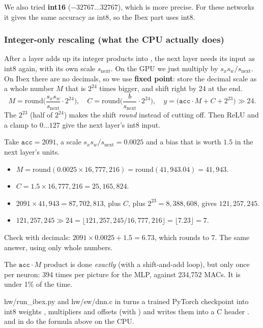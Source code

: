 We also tried \textbf{int16} ($-32767\dots32767$), which is more precise. For these networks it gives
the same accuracy as int8, so the Ibex part uses int8.

\subsubsection*{Integer-only rescaling (what the CPU actually does)}

After a layer adds up its integer products into , the next layer needs its input as int8
again, with its own scale $s_{\text{next}}$. On the GPU we just multiply by
$s_x s_w/s_{\text{next}}$. On Ibex there are no decimals, so we use \textbf{fixed point}: store the
decimal scale as a whole number $M$ that is $2^{24}$ times bigger, and shift right by 24 at the end.
\[
  M = \text{round}\Big(\frac{s_x s_w}{s_{\text{next}}}\cdot 2^{24}\Big),\quad
  C = \text{round}\Big(\frac{b}{s_{\text{next}}}\cdot 2^{24}\Big),\quad
  y = \big(\texttt{acc}\cdot M + C + 2^{23}\big) \gg 24.
\]
The $2^{23}$ (half of $2^{24}$) makes the shift \emph{round} instead of cutting off. Then ReLU and a
clamp to $0\dots127$ give the next layer's int8 input.

\begin{example}
Take $\texttt{acc} = 2091$, a scale $s_xs_w/s_{\text{next}} = 0.0025$ and a bias that is worth $1.5$
in the next layer's units.
\begin{itemize}
  \item $M = \text{round}(0.0025\times 16{,}777{,}216) = \text{round}(41{,}943.04) = 41{,}943$.
  \item $C = 1.5\times16{,}777{,}216 = 25{,}165{,}824$.
  \item $2091\times 41{,}943 = 87{,}702{,}813$, plus $C$, plus $2^{23} = 8{,}388{,}608$, gives
        $121{,}257{,}245$.
  \item $121{,}257{,}245 \gg 24 = \lfloor 121{,}257{,}245 / 16{,}777{,}216\rfloor = \lfloor 7.23\rfloor = 7$.
\end{itemize}
Check with decimals: $2091\times0.0025 + 1.5 = 6.73$, which rounds to 7. The same answer, using only
whole numbers.
\end{example}

The $\texttt{acc}\cdot M$ product is done \emph{exactly} (with a shift-and-add loop), but only once per
neuron: 394 times per picture for the MLP, against 234{,}752 MACs. It is under 1\% of the time.

\begin{inthecode}{hw/run\_ibex.py and hw/sw/dnn.c}
 in  turns a trained PyTorch checkpoint into int8 weights
, multipliers  and offsets  (with ) and writes them into a C header
.  and  in  do the formula above on the CPU.
\end{inthecode}

